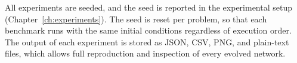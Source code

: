 All experiments are seeded, and the seed is reported in the experimental
setup (Chapter~\ref{ch:experiments}). The seed is reset per problem, so
that each benchmark runs with the same initial conditions regardless of
execution order. The output of each experiment is stored as JSON, CSV,
PNG, and plain-text files, which allows full reproduction and
inspection of every evolved network.

